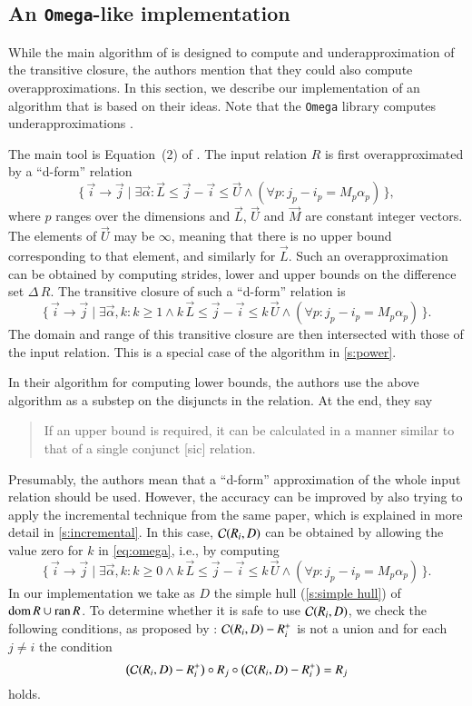 \subsection{An {\tt Omega}-like implementation}

While the main algorithm of \textcite{Kelly1996closure} is
designed to compute and underapproximation of the transitive closure,
the authors mention that they could also compute overapproximations.
In this section, we describe our implementation of an algorithm
that is based on their ideas.
Note that the {\tt Omega} library computes underapproximations
\parencite[Section 6.4]{Omega_lib}.

The main tool is Equation~(2) of \textcite{Kelly1996closure}.
The input relation $R$ is first overapproximated by a ``d-form'' relation
$$
\{\, \vec i \to \vec j \mid \exists \vec \alpha :
\vec L \le \vec j - \vec i \le \vec U
\wedge
(\forall p : j_p - i_p = M_p \alpha_p)
\,\}
,
$$
where $p$ ranges over the dimensions and $\vec L$, $\vec U$ and
$\vec M$ are constant integer vectors.  The elements of $\vec U$
may be $\infty$, meaning that there is no upper bound corresponding
to that element, and similarly for $\vec L$.
Such an overapproximation can be obtained by computing strides,
lower and upper bounds on the difference set $\Delta \, R$.
The transitive closure of such a ``d-form'' relation is
\begin{equation}
\label{eq:omega}
\{\, \vec i \to \vec j \mid \exists \vec \alpha, k :
k \ge 1 \wedge
k \, \vec L \le \vec j - \vec i \le k \, \vec U
\wedge
(\forall p : j_p - i_p = M_p \alpha_p)
\,\}
.
\end{equation}
The domain and range of this transitive closure are then
intersected with those of the input relation.
This is a special case of the algorithm in \autoref{s:power}.

In their algorithm for computing lower bounds, the authors
use the above algorithm as a substep on the disjuncts in the relation.
At the end, they say
\begin{quote}
If an upper bound is required, it can be calculated in a manner
similar to that of a single conjunct [sic] relation.
\end{quote}
Presumably, the authors mean that a ``d-form'' approximation
of the whole input relation should be used.
However, the accuracy can be improved by also trying to
apply the incremental technique from the same paper,
which is explained in more detail in \autoref{s:incremental}.
In this case, ${\cal C}(R_i,D)$ can be obtained by
allowing the value zero for $k$ in \eqref{eq:omega},
i.e., by computing
$$
\{\, \vec i \to \vec j \mid \exists \vec \alpha, k :
k \ge 0 \wedge
k \, \vec L \le \vec j - \vec i \le k \, \vec U
\wedge
(\forall p : j_p - i_p = M_p \alpha_p)
\,\}
.
$$
In our implementation we take as $D$ the simple hull
(\autoref{s:simple hull}) of $\mathop{\rm dom}\nolimits R \cup \mathop{\rm ran}\nolimits R$.
To determine whether it is safe to use ${\cal C}(R_i,D)$,
we check the following conditions, as proposed by
\textcite{Kelly1996closure}:
${\cal C}(R_i,D) - R_i^+$ is not a union and for each $j \ne i$
the condition
$$
\left({\cal C}(R_i,D) - R_i^+\right)
\circ
R_j
\circ
\left({\cal C}(R_i,D) - R_i^+\right)
=
R_j
$$
holds.
